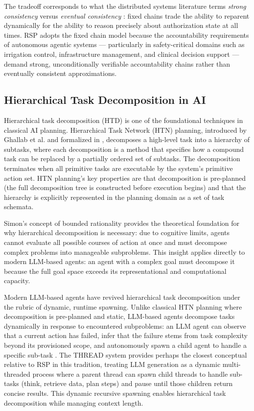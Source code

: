 The tradeoff corresponds to what the distributed systems literature terms \emph{strong consistency} versus \emph{eventual consistency} \cite{vogels2009eventual}: fixed chains trade the ability to reparent dynamically for the ability to reason precisely about authorization state at all times. RSP adopts the fixed chain model because the accountability requirements of autonomous agentic systems --- particularly in safety-critical domains such as irrigation control, infrastructure management, and clinical decision support --- demand strong, unconditionally verifiable accountability chains rather than eventually consistent approximations.

\subsection{Hierarchical Task Decomposition in AI}

Hierarchical task decomposition (HTD) is one of the foundational techniques in classical AI planning. Hierarchical Task Network (HTN) planning, introduced by Ghallab et al. \cite{ghallab2004htn} and formalized in \cite{erpl}, decomposes a high-level task into a hierarchy of subtasks, where each decomposition is a method that specifies how a compound task can be replaced by a partially ordered set of subtasks. The decomposition terminates when all primitive tasks are executable by the system's primitive action set. HTN planning's key properties are that decomposition is pre-planned (the full decomposition tree is constructed before execution begins) and that the hierarchy is explicitly represented in the planning domain as a set of task schemata.

Simon's concept of bounded rationality \cite{simon} provides the theoretical foundation for why hierarchical decomposition is necessary: due to cognitive limits, agents cannot evaluate all possible courses of action at once and must decompose complex problems into manageable subproblems. This insight applies directly to modern LLM-based agents: an agent with a complex goal must decompose it because the full goal space exceeds its representational and computational capacity.

Modern LLM-based agents have revived hierarchical task decomposition under the rubric of dynamic, runtime spawning. Unlike classical HTN planning where decomposition is pre-planned and static, LLM-based agents decompose tasks dynamically in response to encountered subproblems: an LLM agent can observe that a current action has failed, infer that the failure stems from task complexity beyond its provisioned scope, and autonomously spawn a child agent to handle a specific sub-task \cite{press2022,yao2022}. The THREAD system \cite{thread2025} provides perhaps the closest conceptual relative to RSP in this tradition, treating LLM generation as a dynamic multi-threaded process where a parent thread can spawn child threads to handle sub-tasks (think, retrieve data, plan steps) and pause until those children return concise results. This dynamic recursive spawning enables hierarchical task decomposition while managing context length.

